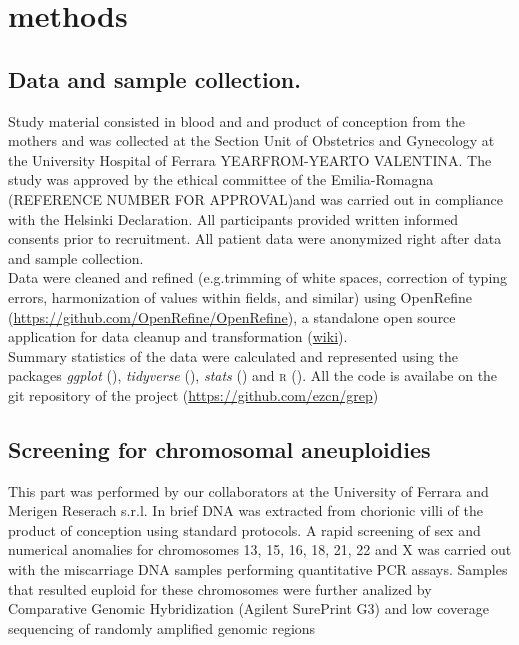 \chapter{methods}

\section{Data and sample collection.} Study material consisted in blood and and product of conception from the mothers and was collected at the Section Unit of Obstetrics and Gynecology at the University Hospital of Ferrara YEARFROM-YEARTO VALENTINA. The study was approved by the ethical committee of the Emilia-Romagna (REFERENCE NUMBER  FOR APPROVAL)and was carried out in compliance with the Helsinki Declaration. All participants provided written informed consents prior to recruitment. All patient data were anonymized right after data and sample collection.\\ 

Data were cleaned and refined (e.g.trimming of white spaces, correction of typing errors, harmonization of values within fields, and similar) using OpenRefine (\url{https://github.com/OpenRefine/OpenRefine}), a standalone open source application for data cleanup and transformation (\href{https://en.wikipedia.org/wiki/OpenRefine}{wiki}).\\

Summary statistics of the data were calculated and represented using the packages \textit{ggplot} (\cite{ggplot2}), \textit{tidyverse} (\cite{wickham2019welcome}), \textit{stats} (\cite{statsR}) and \textsc{r} (\cite{R}). All the code is availabe on the git repository of the project (\url{https://github.com/ezcn/grep}) 

\section{Screening for chromosomal aneuploidies}

This part was performed by our collaborators at the University of Ferrara and Merigen Reserach s.r.l. In brief DNA was extracted from chorionic villi of the product of conception using standard protocols. A rapid screening of sex and numerical anomalies for chromosomes 13, 15, 16, 18, 21, 22 and X was carried out with the miscarriage DNA samples performing quantitative PCR assays. Samples that resulted euploid for these chromosomes were further analized by Comparative Genomic Hybridization (Agilent SurePrint G3) and low coverage sequencing of randomly amplified genomic regions


